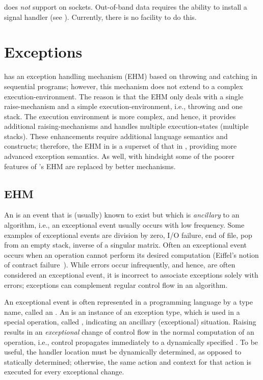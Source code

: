 \documentclass[openright,twoside]{report}
\begin{document}
\begin{annotation}
\uC does \emph{not} support  on sockets.
Out-of-band data requires the ability to install a signal handler (see ).
Currently, there is no facility to do this.
\end{annotation}


\chapter{Exceptions}
\label{s:Exceptions}

\CC has an exception handling mechanism (EHM) based on throwing and catching in sequential programs;
however, this mechanism does not extend to a complex execution-environment.
The reason is that the \CC EHM only deals with a single raise-mechanism and a simple execution-environment, i.e., throwing and one stack.
The \uC execution environment is more complex, and hence, it provides additional raising-mechanisms and handles multiple execution-states (multiple stacks).
These enhancements require additional language semantics and constructs;
therefore, the EHM in \uC is a superset of that in \CC, providing more advanced exception semantics.
As well, with hindsight some of the poorer features of \CC's EHM are replaced by better mechanisms.


\section{EHM}

An  is an event that is (usually) known to exist but which is \emph{ancillary} to an algorithm, i.e., an exceptional event usually occurs with low frequency.
Some examples of exceptional events are division by zero, I/O failure, end of file, pop from an empty stack, inverse of a singular matrix.
Often an exceptional event occurs when an operation cannot perform its desired computation (Eiffel's notion of contract failure~\cite[p.~395]{Eiffel}).
While errors occur infrequently, and hence, are often considered an exceptional event, it is incorrect to associate exceptions solely with errors;
exceptions can complement regular control flow in an algorithm.

An exceptional event is often represented in a programming language by a type name, called an .
An  is an instance of an exception type, which is used in a special operation, called , indicating an ancillary (exceptional) situation.
Raising results in an \emph{exceptional} change of control flow in the normal computation of an operation, i.e., control propagates immediately to a dynamically specified .
To be useful, the handler location must be dynamically determined, as opposed to statically determined;
otherwise, the same action and context for that action is executed for every exceptional change.
\end{document}
